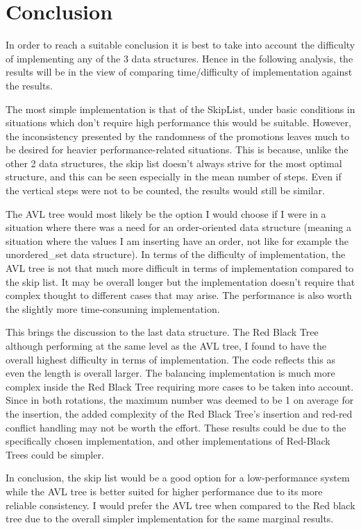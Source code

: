 \documentclass[12pt, a4paper]{report}
\begin{document}
\section{Conclusion}
In order to reach a suitable conclusion it is best to take into account the difficulty of implementing any of the 3 data structures. Hence in the following analysis, the results will be in the view of comparing time/difficulty of implementation against the results.

The most simple implementation is that of the SkipList, under basic conditions in situations which don't require high performance this would be suitable. However, the inconsistency presented by the randomness of the promotions leaves much to be desired for heavier performance-related situations. This is because, unlike the other 2 data structures, the skip list doesn't always strive for the most optimal structure, and this can be seen especially in the mean number of steps. Even if the vertical steps were not to be counted, the results would still be similar.

The AVL tree would most likely be the option I would choose if I were in a situation where there was a need for an order-oriented data structure (meaning a situation where the values I am inserting have an order, not like for example the unordered\_set data structure). In terms of the difficulty of implementation, the AVL tree is not that much more difficult in terms of implementation compared to the skip list. It may be overall longer but the implementation doesn't require that complex thought to different cases that may arise. The performance is also worth the slightly more time-consuming implementation. 

This brings the discussion to the last data structure. The Red Black Tree although performing at the same level as the AVL tree, I found to have the overall highest difficulty in terms of implementation. The code reflects this as even the length is overall larger. The balancing implementation is much more complex inside the Red Black Tree requiring more cases to be taken into account. Since in both rotations, the maximum number was deemed to be 1 on average for the insertion, the added complexity of the Red Black Tree's insertion and red-red conflict handling may not be worth the effort. These results could be due to the specifically chosen implementation, and other implementations of Red-Black Trees could be simpler. 

In conclusion, the skip list would be a good option for a low-performance system while the AVL tree is better suited for higher performance due to its more reliable consistency. I would prefer the AVL tree when compared to the Red black tree due to the overall simpler implementation for the same marginal results.
\end{document}
